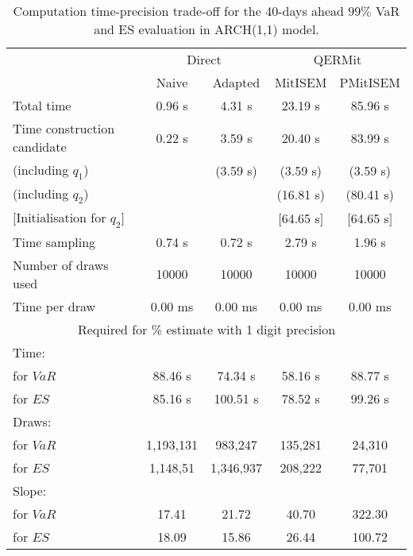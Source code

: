{ \renewcommand{\arraystretch}{1.3} 
\begin{table}[h] 
\centering 
\caption{Computation time-precision trade-off for the 40-days ahead  $99\%$ VaR and ES evaluation in ARCH(1,1) model.} 
\label{tab:time_precision_arch} 
\begin{tabular}{lcccc}  
  & \multicolumn{2}{c}{Direct} & \multicolumn{2}{c}{QERMit}  \\ \cline{2-5} 
  & Naive & Adapted & MitISEM & PMitISEM  \\ \hline 
Total time & 0.96 s & 4.31 s & 23.19 s & 85.96 s \\ 
Time construction candidate & 0.22 s & 3.59 s & 20.40 s & 83.99 s \\ 
 (including $q_{1}$) &   &  (3.59 s) & (3.59 s) & (3.59 s) \\ 
 (including $q_{2}$) &   &  & (16.81 s) & (80.41 s) \\ 
$[$Initialisation for $q_{2}$$]$&   &   & $[$64.65 s$]$ & $[$64.65 s$]$ \\ 
Time sampling & 0.74 s & 0.72 s & 2.79 s & 1.96 s  \\  
Number of draws used & 10000 & 10000 & 10000 & 10000 \\ 
Time per draw & 0.00 ms & 0.00 ms & 0.00 ms & 0.00 ms \\ \hline 
\multicolumn{5}{c}{Required for \% estimate with 1 digit precision} \\ \hline 
Time: &  &  &   &  \\ 
\hspace{1cm} for $VaR$ & 88.46 s & 74.34 s & 58.16 s & 88.77 s \\ 
\hspace{1cm} for $ES$ & 85.16 s & 100.51 s & 78.52 s & 99.26 s \\ 
Draws: &  &  &   &  \\ 
\hspace{1cm} for $VaR$ & 1,193,131 & 983,247  & 135,281  & 24,310  \\ 
\hspace{1cm} for $ES$ & 1,148,51 & 1,346,937  & 208,222   & 77,701  \\ 
\hline 
Slope: &  &  &   &  \\ 
\hspace{1cm} for $VaR$ & 17.41 & 21.72  & 40.70  & 322.30  \\ 
\hspace{1cm} for $ES$ & 18.09 & 15.86  & 26.44   & 100.72  \\  \hline 
\end{tabular} 
\end{table} 
} 
